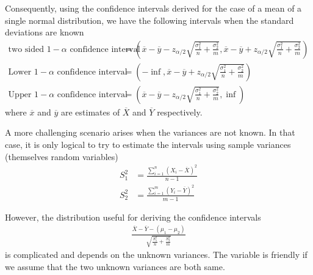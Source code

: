 \documentclass[../probability-notes.tex]{subfiles}
\begin{document}
    Consequently, using the confidence intervals derived for the case of a mean of a single normal distribution, we have the following intervals when the standard deviations are known
    \begin{align*}
        \text{two sided $1 - \alpha$ confidence interval} &= (\overline{x} - \overline{y}-z_{\alpha /2}\sqrt{\frac{\sigma_{1}^{2}}{n} + \frac{\sigma_{2}^{2}}{m}}, \overline{x} - \overline{y}+z_{\alpha /2}\sqrt{\frac{\sigma_{1}^{2}}{n} + \frac{\sigma_{2}^{2}}{m}})\\
        \text{Lower $1-\alpha$ confidence interval} &= (-\inf, \overline{x} - \overline{y}+z_{\alpha /2}\sqrt{\frac{\sigma_{1}^{2}}{n} + \frac{\sigma_{2}^{2}}{m}})\\
        \text{Upper $1-\alpha$ confidence interval} &= (\overline{x} - \overline{y}-z_{\alpha /2}\sqrt{\frac{\sigma_{1}^{2}}{n} + \frac{\sigma_{2}^{2}}{m}}, \inf)
    \end{align*}
    where $\overline{x}$ and $\overline{y}$ are estimates of $\overline{X}$ and $\overline{Y}$ respectively.

    A more challenging scenario arises when the variances are not known. In that case, it is only logical to try to estimate the intervals using sample variances (themselves random variables)
    \begin{align*}
        S_{1}^{2} &= \frac{\sum_{i=1}^{n} (X_{i} - \overline{X})^{2}}{n-1}\\
        S_{2}^{2} &= \frac{\sum_{i=1}^{m} (Y_{i} - \overline{Y})^{2}}{m-1}
    \end{align*}

    However, the distribution useful for deriving the confidence intervals
    \begin{align*}
        \frac{\overline{X} - \overline{Y} - (\mu_{1} - \mu_{2})}{\sqrt{\frac{S_{1}^{2}}{n} + \frac{S_{2}^{2}}{m}}}
    \end{align*}
    is complicated and depends on the unknown variances. The variable is friendly if we assume that the two unknown variances are both same.\newline
\end{document}
